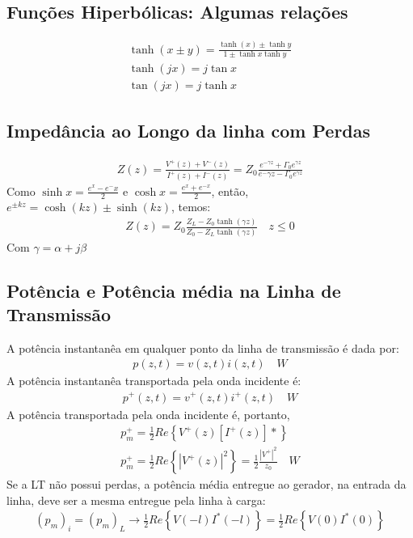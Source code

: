 \documentclass[11pt,a4paper]{article}
\begin{document}
\subsection{Funções Hiperbólicas: Algumas relações}
\begin{align*}
  \tanh (x \pm y) = \frac{\tanh (x) \pm \tanh y}{1 \pm \tanh x \tanh y}\\
  \tanh (jx)= j \tan x \\
  \tan (jx) = j \tanh x
\end{align*}
\subsection{Impedância ao Longo da linha com Perdas}
\begin{align*}
  Z(z)= \frac{V^+ (z) + V^- (z)}{I^+ (z) + I^- (z)}=Z_0 \frac{e^{-\gamma z}+\Gamma_0 e^{\gamma z}}{e^-{\gamma z}- \Gamma_0 e^{\gamma z}}
\end{align*}
Como $\sinh x= \frac{e^x - e^-x}{2}$ e $\cosh x = \frac{e^x + e^{-x}}{2}$, então, $e^{\pm kz}= \cosh (kz) \pm \sinh(kz)$, temos:
\begin{align*}
  Z(z)= Z_0 \frac{Z_L - Z_0 \tanh (\gamma z)}{Z_0 - Z_L \tanh(\gamma z)} \quad z \leq 0
\end{align*}
Com $\gamma = \alpha + j \beta$
\subsection{Potência e Potência média na Linha de Transmissão}
A potência instantanêa em qualquer ponto da linha de transmissão é dada por:
\begin{align*}
p(z,t) = v(z,t)i(z,t) \quad W
\end{align*}
A potência instantanêa transportada pela onda incidente é:
\begin{align*}
p^+ (z,t)= v^+ (z,t) i^+ (z,t) \quad W
\end{align*}
A potência transportada pela onda incidente é, portanto, 
\begin{align*}
  p_m^+ = \frac{1}{2} Re \left\{ V^+ (z) \left[ I^+ (z) \right]* \right\}\\
  p_m^+ = \frac{1}{2} Re \left\{ \left| V^+(z)\right|^2 \right\}= \frac{1}{2 }\frac{ \left| V^+ \right|^2 }{z_0} \quad W
\end{align*}
Se a LT não possui perdas, a potência média entregue ao gerador, na entrada da linha, deve ser a mesma entregue pela linha à carga:
\begin{align*}
  (p_m)_i = (p_m)_L \to \frac{1}{2} Re \left\{ V(-l) I^*(-l) \right\}= \frac{1}{2} Re \left\{ V(0) I^*(0) \right\}
\end{align*}
\end{document}
